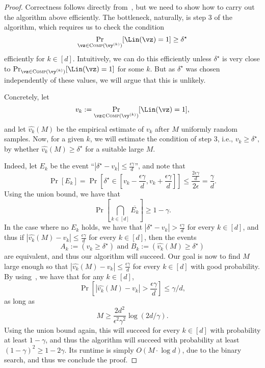 \begin{proof}
Correctness follows directly from~, but we need to show how to carry out the algorithm above efficiently.
The bottleneck, naturally, is step 3 of the algorithm, which requires us to check the condition
\[
	\Pr_{\vz \in \textsc{Comp}(\vy^{(k)})}[\Lin(\vz) = 1] \geq \delta^\star  
\]
efficiently for $k \in [d]$. Intuitively, we can do this efficiently unless $\delta^\star$ is very close to
\(
	\Pr_{\vz \in \textsc{Comp}(\vy^{(k)})}[\Lin(\vz) = 1]
\) for some $k$. But as $\delta^\star$ was chosen independently of these values, we will argue that this is unlikely. 

Concretely, let
\[
	v_k := \Pr_{\vz \in \textsc{Comp}(\vy^{(k)})}[\Lin(\vz) = 1],
\]
and let 
\(
	\hat{v_k}(M)  
\) be the empirical estimate of $v_k$ after $M$ uniformly random samples. 
Now, for a given $k$, we will estimate the condition of step 3, i.e.,
\(
	v_k \geq \delta^\star,
\) by whether \(
	\hat{v_k}(M) \geq \delta^\star 
\) for a suitable large $M$.

Indeed, let $E_k$ be the event ``$|\delta^\star - v_k| \leq \frac{\epsilon \gamma}{d}$'', and note that 
\[
	\Pr[E_k] = \Pr\left[\delta^\star \in \left[v_k - \frac{\epsilon \gamma}{d}, v_k + \frac{\epsilon \gamma}{d}\right]\right] \leq \frac{\frac{2\epsilon \gamma}{d}}{2\epsilon} = \frac{\gamma}{d}.
\]
Using the union bound, we have that 
\[
	\Pr\left[\bigcap_{k \in [d]} \overline{E_k}\right] \geq 1 - \gamma.
\]
In the case where no $E_k$ holds, we have that $|\delta^\star - v_k| > \frac{\epsilon \gamma}{d}$ for every $k \in [d]$, and thus 
if $|\hat{v_k}(M)  - v_k| \leq \frac{\epsilon \gamma}{d}$ for every $k \in [d]$, then the events 
\[
	A_k := \left(v_k \geq \delta^\star \right) \text{ and }  B_k := \left(\hat{v_k}(M) \geq \delta^\star\right)
\]
are equivalent, and thus our algorithm will succeed. Our goal is now to find $M$ large enough so that 
$|\hat{v_k}(M)  - v_k| \leq \frac{\epsilon \gamma}{d}$ for every $k \in [d]$ with good probability. By using~, we have that for any $k \in [d]$,
\[
	\Pr\left[|\hat{v_k}(M) - v_k| > \frac{\epsilon \gamma}{d}\right] \leq  \gamma/d,
\]  as long as 
\[ 
	M \geq \frac{2d^2}{\epsilon^2 \gamma^2}  \log(2d/\gamma).
\]
Using the union bound again, this will succeed for every $k \in [d]$ with probability at least $1 - \gamma$, and thus the algorithm will succeed with probability at least $(1-\gamma)^2  \geq 1 - 2\gamma$. Its runtime is simply
$O(M \cdot \log d)$, due to the binary search, and thus we conclude the proof.


\end{proof}
